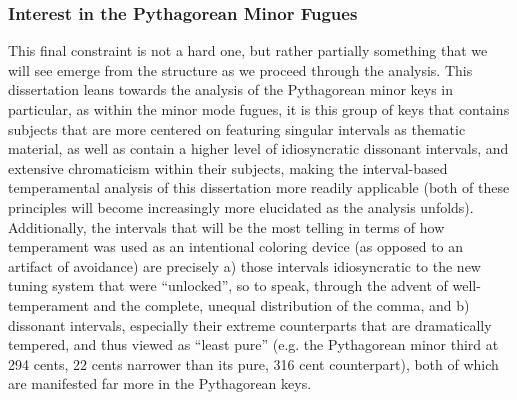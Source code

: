 \subsubsection{Interest in the Pythagorean Minor
Fugues}\label{interest-in-the-pythagorean-minor-fugues}

This final constraint is not a hard one, but rather partially something
that we will see emerge from the structure as we proceed through the
analysis. This dissertation leans towards the analysis of the
Pythagorean minor keys in particular, as within the minor mode fugues,
it is this group of keys that contains subjects that are more centered
on featuring singular intervals as thematic material, as well as contain
a higher level of idiosyncratic dissonant intervals, and extensive
chromaticism within their subjects, making the interval-based
temperamental analysis of this dissertation more readily applicable
(both of these principles will become increasingly more elucidated as
the analysis unfolds). Additionally, the intervals that will be the most
telling in terms of how temperament was used as an intentional coloring
device (as opposed to an artifact of avoidance) are precisely a) those
intervals idiosyncratic to the new tuning system that were ``unlocked'',
so to speak, through the advent of well-temperament and the complete,
unequal distribution of the comma, and b) dissonant intervals,
especially their extreme counterparts that are dramatically tempered,
and thus viewed as ``least pure'' (e.g. the Pythagorean minor third at
294 cents, 22 cents narrower than its pure, 316 cent counterpart), both
of which are manifested far more in the Pythagorean keys.

